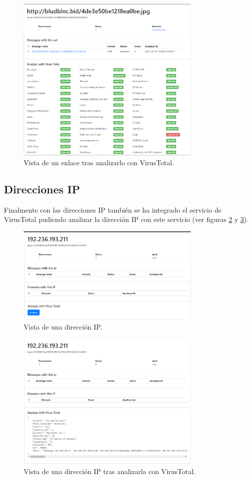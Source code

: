 \begin{figure}[htb]
    \centering
    \includegraphics[width=0.8\textwidth]{imagenes/capturasAplicacion/Enlaces_virusTotal.png}
\caption{Vista de un enlace tras analizarlo con VirusTotal.}
\label{fig:enlace_vt}
\end{figure}

\clearpage
\subsection{Direcciones IP} \label{vista_ip}
Finalmente con las direcciones IP también se ha integrado el servicio de VirusTotal pudiendo analizar la dirección IP con este servicio (ver figuras \ref{fig:ip} y \ref{fig:ip_vt}).

\begin{figure}[htb]
    \centering
    \includegraphics[width=0.8\textwidth]{imagenes/capturasAplicacion/IP.png}
\caption{Vista de una dirección IP.}
\label{fig:ip}
\end{figure}


\begin{figure}[htb]
    \centering
    \includegraphics[width=0.8\textwidth]{imagenes/capturasAplicacion/IP_vt.png}
\caption{Vista de una dirección IP tras analizarla con VirusTotal.}
\label{fig:ip_vt}
\end{figure}